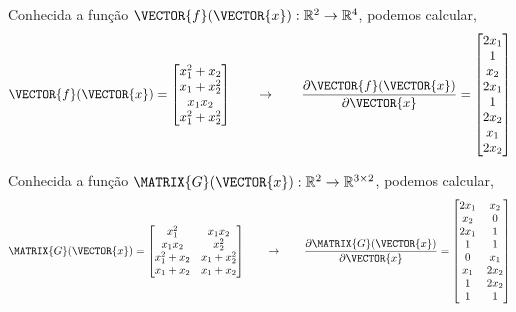 \begin{example}
Conhecida a função $\VECTOR{f}(\VECTOR{x}): \mathbb{R}^2 \rightarrow \mathbb{R}^4$, podemos calcular,
\begin{equation}
\VECTOR{f}(\VECTOR{x})=
\begin{bmatrix}
x_1^2+x_2\\
x_1+x_2^2\\
x_1 x_2 \\
x_1^2+x_2^2
\end{bmatrix}
\qquad \rightarrow \qquad
\frac{\partial \VECTOR{f}(\VECTOR{x}) }{\partial \VECTOR{x}}= 
\begin{bmatrix}
2 x_1 \\
1     \\
x_2   \\
2 x_1 \\
1     \\
2 x_2 \\
x_1   \\
2 x_2
\end{bmatrix}
\end{equation}
\end{example}


\begin{example}
Conhecida a função $\MATRIX{G}(\VECTOR{x}): \mathbb{R}^2 \rightarrow \mathbb{R}^{3 \times 2}$, podemos calcular,
\begin{equation}
\MATRIX{G}(\VECTOR{x})=
\begin{bmatrix}
x_1^2       & x_1 x_2\\
x_1 x_2     & x_2^2\\
x_1^2 + x_2 & x_1 + x_2^2\\
x_1 + x_2   & x_1 + x_2
\end{bmatrix}
\qquad \rightarrow \qquad
\frac{\partial \MATRIX{G}(\VECTOR{x}) }{\partial \VECTOR{x}}= 
\begin{bmatrix}
2 x_1 & x_2\\ 
  x_2 & 0  \\ 
2 x_1 & 1  \\ 
    1 & 1  \\ 
0   &   x_1\\
x_1 & 2 x_2\\
1   & 2 x_2\\
1   & 1
\end{bmatrix}
\end{equation}
\end{example}

